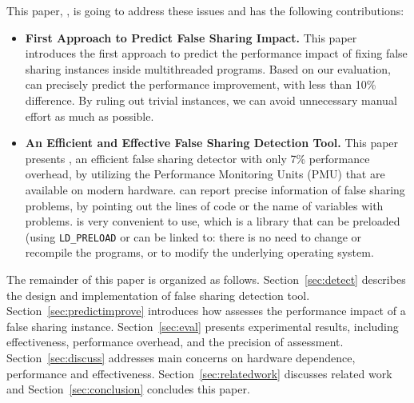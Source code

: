 \vspace{0.2in}


This paper, \cheetah{}, is going to address these issues and has the following contributions:

\begin{itemize} 

\item {\bf First Approach to Predict False Sharing Impact.} This paper introduces the first approach to predict the performance impact of fixing false sharing instances inside multithreaded programs. Based on our evaluation, \cheetah{} can precisely predict the performance improvement, with less than 10\% difference. By ruling out trivial instances, we can avoid unnecessary manual effort as much as possible. 

\item {\bf An Efficient and Effective False Sharing Detection Tool.} This paper presents \cheetah{}, an efficient false sharing detector with only 7\% performance overhead, by utilizing the Performance Monitoring Units (PMU) that are available on modern hardware. \cheetah{} can report precise information of false sharing problems, by pointing out the lines of code or the name of variables with problems. \cheetah{} is very convenient to use, which is a library that can be preloaded (using \texttt{LD\_PRELOAD} or can be linked to: there is no need to change or recompile the programs, or to modify the underlying operating system.

\end{itemize}

The remainder of this paper is organized as follows. 
Section~\ref{sec:detect} describes the design and implementation of false sharing detection tool. Section~\ref{sec:predictimprove} introduces how \cheetah{} assesses the performance impact of a false sharing instance. Section~\ref{sec:eval} presents experimental results, including effectiveness, performance overhead, and the precision of assessment. Section~\ref{sec:discuss} addresses main concerns on hardware dependence, performance and effectiveness. Section~\ref{sec:relatedwork} discusses related work and Section~\ref{sec:conclusion} concludes this paper. 



